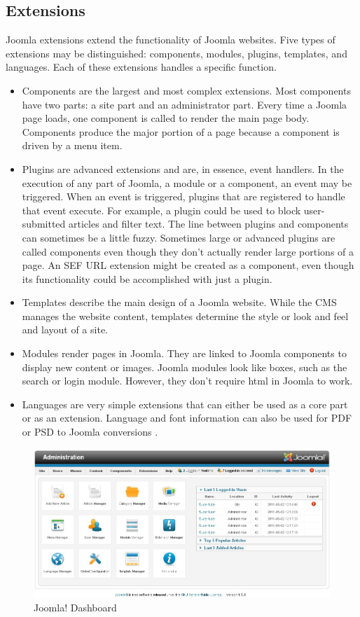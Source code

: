 \subsection{Extensions}
\label{subsec:joomla_ext}
Joomla extensions extend the functionality of Joomla websites. Five types of extensions may be distinguished: components, modules, plugins, templates, and languages. Each of these extensions handles a specific function.
\begin{itemize}
	\item Components are the largest and most complex extensions. Most components have two parts: a site part and an administrator part. Every time a Joomla page loads, one component is called to render the main page body. Components produce the major portion of a page because a component is driven by a menu item.
	\item Plugins are advanced extensions and are, in essence, event handlers. In the execution of any part of Joomla, a module or a component, an event may be triggered. When an event is triggered, plugins that are registered to handle that event execute. For example, a plugin could be used to block user-submitted articles and filter text. The line between plugins and components can sometimes be a little fuzzy. Sometimes large or advanced plugins are called components even though they don't actually render large portions of a page. An SEF URL extension might be created as a component, even though its functionality could be accomplished with just a plugin.
	\item Templates describe the main design of a Joomla website. While the CMS manages the website content, templates determine the style or look and feel and layout of a site.
	\item Modules render pages in Joomla. They are linked to Joomla components to display new content or images. Joomla modules look like boxes, such as the search or login module. However, they don’t require html in Joomla to work.
	\item Languages are very simple extensions that can either be used as a core part or as an extension. Language and font information can also be used for PDF or PSD to Joomla conversions \cite{cms_joomla_overview}.
\end{itemize}




\begin {figure}[h]
\graphicspath{{images/chapter_cms/}}
\includegraphics[width=\textwidth]{joomla_dash}
\caption{Joomla! Dashboard}
\end {figure}
